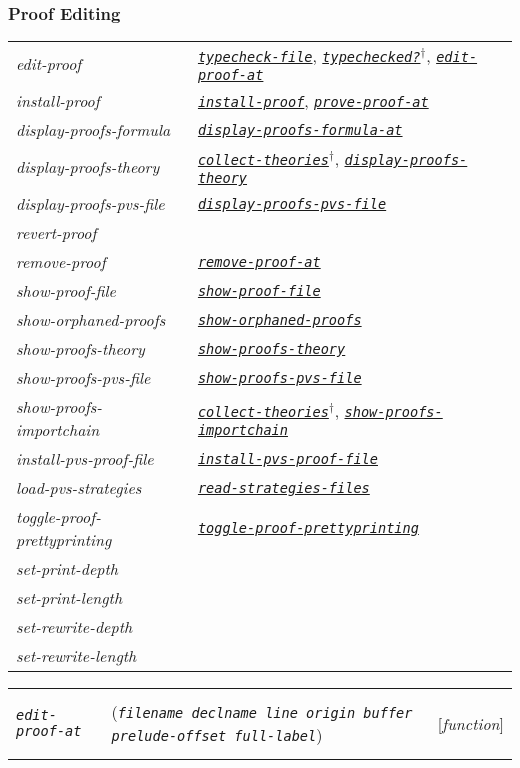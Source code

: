 \documentclass[12pt]{book}
\makeatletter
\newenvironment{function}[3]%
{\par\noindent\begin{boxedminipage}{\textwidth}%
 \par\noindent\begin{tabularx}{\linewidth}{l>{\raggedright}Xr}%
 \functionhtgt{#1}&(\texttt{\textit{#2}})&[\emph{#3}]%
 \end{tabularx}\par\flushright\begin{minipage}{.97\textwidth}}
{\end{minipage}\end{boxedminipage}}
\newcommand{\functionnm}[1]{\texttt{\textit{#1}}}
\newcommand{\functionhln}[1]{\hyperlink{#1}{\functionnm{#1}}}
\newcommand{\functionhtgt}[1]{\hypertarget{#1}{\functionnm{#1}}\index{#1@\functionnm{#1}|underline}}
\newenvironment{lispfunction}[2]%
{\begin{function}{#1}{#2}{function}}{\end{function}}
\makeatother
\begin{document}
\subsubsection{Proof Editing}
\noindent\begin{tabularx}{\linewidth}{|>{\itshape\ttfamily}l|>{\raggedright\arraybackslash}X|}\hline
  edit-proof & \functionhln{typecheck-file},
               \functionhln{typechecked?}$^\dagger$,
               \functionhln{edit-proof-at} \\
  install-proof & \functionhln{install-proof},
                  \functionhln{prove-proof-at} \\
  display-proofs-formula & \functionhln{display-proofs-formula-at} \\
  display-proofs-theory & \functionhln{collect-theories}$^\dagger$,
                          \functionhln{display-proofs-theory} \\
  display-proofs-pvs-file & \functionhln{display-proofs-pvs-file} \\
  revert-proof & \\
  remove-proof & \functionhln{remove-proof-at} \\
  show-proof-file & \functionhln{show-proof-file} \\
  show-orphaned-proofs & \functionhln{show-orphaned-proofs} \\
  show-proofs-theory & \functionhln{show-proofs-theory} \\
  show-proofs-pvs-file & \functionhln{show-proofs-pvs-file} \\
  show-proofs-importchain & \functionhln{collect-theories}$^\dagger$,
                            \functionhln{show-proofs-importchain} \\
  install-pvs-proof-file & \functionhln{install-pvs-proof-file} \\
  load-pvs-strategies & \functionhln{read-strategies-files} \\
  toggle-proof-prettyprinting & \functionhln{toggle-proof-prettyprinting} \\
  set-print-depth & \\
  set-print-length & \\
  set-rewrite-depth & \\
  set-rewrite-length & \\ \hline
\end{tabularx}

\begin{lispfunction}{edit-proof-at}
  {filename declname line origin buffer prelude-offset full-label}
\end{lispfunction}
\end{document}
